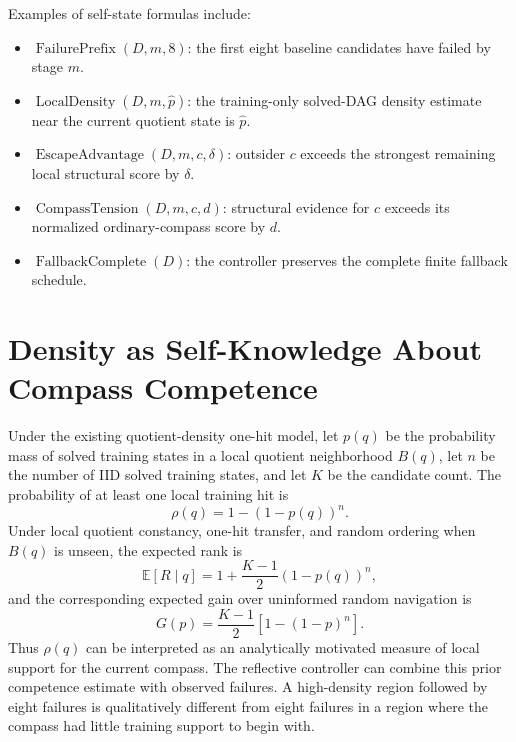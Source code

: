\documentclass[11pt]{article}
\begin{document}
Examples of self-state formulas include:
\begin{itemize}
\item $\operatorname{FailurePrefix}(D,m,8)$: the first eight baseline candidates have failed by stage $m$.
\item $\operatorname{LocalDensity}(D,m,\widehat p)$: the training-only solved-DAG density estimate near the current quotient state is $\widehat p$.
\item $\operatorname{EscapeAdvantage}(D,m,c,\delta)$: outsider $c$ exceeds the strongest remaining local structural score by $\delta$.
\item $\operatorname{CompassTension}(D,m,c,d)$: structural evidence for $c$ exceeds its normalized ordinary-compass score by $d$.
\item $\operatorname{FallbackComplete}(D)$: the controller preserves the complete finite fallback schedule.
\end{itemize}

\section{Density as Self-Knowledge About Compass Competence}
Under the existing quotient-density one-hit model, let $p(q)$ be the probability mass of solved training states in a local quotient neighborhood $B(q)$, let $n$ be the number of IID solved training states, and let $K$ be the candidate count. The probability of at least one local training hit is
\[
\rho(q)=1-(1-p(q))^n.
\]
Under local quotient constancy, one-hit transfer, and random ordering when $B(q)$ is unseen, the expected rank is
\[
\mathbb E[R\mid q]=1+\frac{K-1}{2}(1-p(q))^n,
\]
and the corresponding expected gain over uninformed random navigation is
\[
G(p)=\frac{K-1}{2}\left[1-(1-p)^n\right].
\]
Thus $\rho(q)$ can be interpreted as an analytically motivated measure of local support for the current compass. The reflective controller can combine this prior competence estimate with observed failures. A high-density region followed by eight failures is qualitatively different from eight failures in a region where the compass had little training support to begin with.
\end{document}
